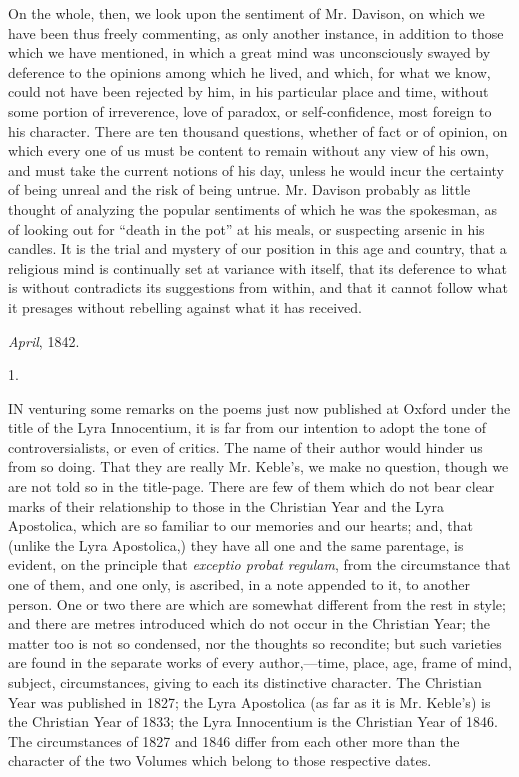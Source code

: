 On the whole, then, we look upon the sentiment of
Mr. Davison, on which we have been thus freely commenting, as only
another instance, in addition to those which we have mentioned, in
which a great mind was unconsciously swayed by deference to the
opinions among which he lived, and which, for what we know,
could not have been rejected by him, in his particular place and time,
without some portion of irreverence, love of paradox, or
self-confidence, most foreign to his character. There are ten thousand
questions, whether of fact or of opinion, on which every one of us
must be content to remain without any view of his own, and must take
the current notions of his day, unless he would incur the certainty of
being unreal and the risk of being untrue. Mr. Davison probably as
little thought of analyzing the popular sentiments of which he was the
spokesman, as of looking out for ``death in the pot'' at his meals, or
suspecting arsenic in his candles. It is the trial and mystery of our
position in this age and country, that a religious mind is continually
set at variance with itself, that its deference to what is without
contradicts its suggestions from within, and that it cannot follow
what it presages without rebelling against what it has received.

\emph{April}, 1842.


1.

IN
venturing some remarks on the poems just now published at Oxford under
the title of the Lyra Innocentium, it is far from our intention to
adopt the tone of controversialists, or even of critics. The name of
their author would hinder us from so doing. That they are really Mr.
Keble's, we make no question, though we are not told so in the
title-page. There are few of them which do not bear clear marks of
their relationship to those in the Christian Year and the Lyra
Apostolica, which are so familiar to our memories and our hearts; and,
that (unlike the Lyra Apostolica,) they have all one and the same
parentage, is evident, on the principle that \emph{exceptio
probat regulam}, from
the circumstance that one of them, and one only, is ascribed, in a
note appended to it, to another person. One or two there are which are
somewhat different from the rest in style; and there are metres
introduced which do not occur in the Christian Year; the matter too is
not so condensed, nor the thoughts so recondite; but such varieties
are found in the separate works of every author,—time, place, age,
frame of mind, subject, circumstances, giving to each its distinctive
character. The Christian Year was published in 1827; the Lyra
Apostolica (as far as it is Mr. Keble's) is the Christian Year of
1833; the Lyra Innocentium is the Christian Year of 1846. The
circumstances of 1827 and 1846 differ from each other more than the
character of the two Volumes which belong to those respective dates.

